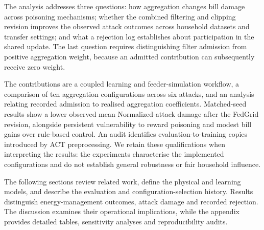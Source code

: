 The analysis addresses three questions: how aggregation changes bill damage across poisoning mechanisms; whether the combined filtering and clipping revision improves the observed attack outcomes across household datasets and transfer settings; and what a rejection log establishes about participation in the shared update. The last question requires distinguishing filter admission from positive aggregation weight, because an admitted contribution can subsequently receive zero weight.

The contributions are a coupled learning and feeder-simulation workflow, a comparison of ten aggregation configurations across six attacks, and an analysis relating recorded admission to realised aggregation coefficients. Matched-seed results show a lower observed mean Normalized-attack damage after the FedGrid revision, alongside persistent vulnerability to reward poisoning and modest bill gains over rule-based control. An audit identifies evaluation-to-training copies introduced by ACT preprocessing. We retain these qualifications when interpreting the results: the experiments characterise the implemented configurations and do not establish general robustness or fair household influence.

The following sections review related work, define the physical and learning models, and describe the evaluation and configuration-selection history. Results distinguish energy-management outcomes, attack damage and recorded rejection. The discussion examines their operational implications, while the appendix provides detailed tables, sensitivity analyses and reproducibility audits.
